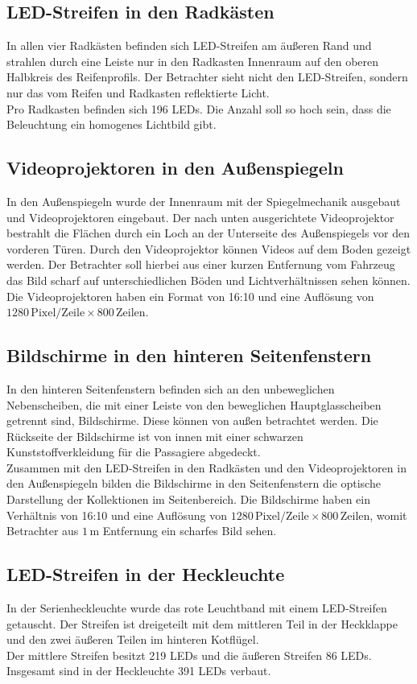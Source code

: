 \subsection{LED-Streifen in den Radkästen}
In allen vier Radkästen befinden sich LED-Streifen am äußeren Rand und strahlen durch eine Leiste nur in den Radkasten Innenraum auf den oberen Halbkreis des Reifenprofils. Der Betrachter sieht nicht den LED-Streifen, sondern nur das vom Reifen und Radkasten reflektierte Licht. \\
Pro Radkasten befinden sich 196 LEDs. Die Anzahl soll so hoch sein, dass die Beleuchtung ein homogenes Lichtbild gibt.
\subsection{Videoprojektoren in den Außenspiegeln}
In den Außenspiegeln wurde der Innenraum mit der Spiegelmechanik ausgebaut und Videoprojektoren eingebaut. Der nach unten ausgerichtete Videoprojektor bestrahlt die Flächen durch ein Loch an der Unterseite des Außenspiegels vor den vorderen Türen.
Durch den Videoprojektor können Videos auf dem Boden gezeigt werden. Der Betrachter soll hierbei aus einer kurzen Entfernung vom Fahrzeug das Bild scharf auf unterschiedlichen Böden und Lichtverhältnissen sehen können. \\
Die Videoprojektoren haben ein Format von 16:10 und eine Auflösung von $ 1280\,\mathrm{Pixel}/\mathrm{Zeile} \times 800\,\mathrm{Zeilen} $.
\subsection{Bildschirme in den hinteren Seitenfenstern}
In den hinteren Seitenfenstern befinden sich an den unbeweglichen Nebenscheiben, die mit einer Leiste von den beweglichen Hauptglasscheiben getrennt sind, Bildschirme. Diese können von außen betrachtet werden. Die Rückseite der Bildschirme ist von innen mit einer schwarzen Kunststoffverkleidung für die Passagiere abgedeckt.\\
Zusammen mit den LED-Streifen in den Radkästen und den Videoprojektoren in den Außenspiegeln bilden die Bildschirme in den Seitenfenstern die optische Darstellung der Kollektionen im Seitenbereich.
Die Bildschirme haben ein Verhältnis von 16:10 und eine Auflösung von $ 1280\,\mathrm{Pixel}/\mathrm{Zeile} \times 800 \,\mathrm{Zeilen} $, womit Betrachter aus $ 1\,\mathrm{m} $ Entfernung ein scharfes Bild sehen.
\subsection{LED-Streifen in der Heckleuchte}
In der Serienheckleuchte wurde das rote Leuchtband mit einem LED-Streifen getauscht. Der Streifen ist dreigeteilt mit dem mittleren Teil in der Heckklappe und den zwei äußeren Teilen im hinteren Kotflügel. \\
Der mittlere Streifen besitzt 219 LEDs und die äußeren Streifen 86 LEDs. Insgesamt sind in der Heckleuchte 391 LEDs verbaut.
